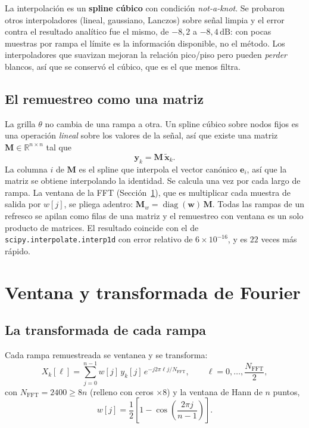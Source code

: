 La interpolación es un \textbf{spline cúbico} con condición
\emph{not-a-knot}. Se probaron otros interpoladores (lineal, gaussiano,
Lanczos) sobre señal limpia y el error contra el resultado analítico fue el
mismo, de $-8{,}2$ a $-8{,}4\,\text{dB}$: con pocas muestras por rampa el
límite es la información disponible, no el método. Los interpoladores que
suavizan mejoran la relación pico/piso pero pueden \emph{perder} blancos, así
que se conservó el cúbico, que es el que menos filtra.

\subsection{El remuestreo como una matriz}

La grilla $\theta$ no cambia de una rampa a otra. Un spline cúbico sobre
nodos fijos es una operación \emph{lineal} sobre los valores de la señal, así
que existe una matriz $\mathbf{M}\in\mathbb{R}^{n\times n}$ tal que
\begin{equation}
  \mathbf{y}_k = \mathbf{M}\,\tilde{\mathbf{x}}_k .
\end{equation}
La columna $i$ de $\mathbf{M}$ es el spline que interpola el vector
canónico $\mathbf{e}_i$, así que la matriz se obtiene interpolando la
identidad. Se calcula una vez por cada largo de rampa. La ventana de la FFT
(Sección~\ref{sec:proc_fft}), que es multiplicar cada muestra de salida por
$w[j]$, se pliega adentro: $\mathbf{M}_w = \operatorname{diag}(\mathbf{w})
\,\mathbf{M}$. Todas las rampas de un refresco se apilan como filas de una
matriz y el remuestreo con ventana es un solo producto de matrices. El
resultado coincide con el de \texttt{scipy.interpolate.interp1d} con error
relativo de $6\times10^{-16}$, y es $22$ veces más rápido.

\section{Ventana y transformada de Fourier}
\label{sec:proc_fft}

\subsection{La transformada de cada rampa}

Cada rampa remuestreada se ventanea y se transforma:
\begin{equation}
  X_k[\ell] = \sum_{j=0}^{n-1} w[j]\, y_k[j]\,
  e^{-j2\pi \ell j / N_\text{FFT}},
  \qquad \ell = 0, \dots, \frac{N_\text{FFT}}{2},
  \label{eq:proc_fft}
\end{equation}
con $N_\text{FFT} = 2400 \geq 8n$ (relleno con ceros $\times 8$) y la
ventana de Hann de $n$ puntos,
\begin{equation}
  w[j] = \frac{1}{2}\left[1 - \cos\!\left(\frac{2\pi j}{n-1}\right)\right].
\end{equation}

